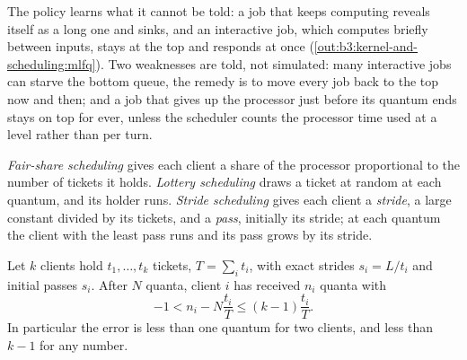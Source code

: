 The policy learns what it cannot be told: a job that keeps computing reveals itself as a long one and sinks, and an interactive job, which computes briefly between inputs, stays at the top and responds at once (\cref{out:b3:kernel-and-scheduling:mlfq}). Two weaknesses are told, not simulated: many interactive jobs can starve the bottom queue, the remedy is to move every job back to the top now and then; and a job that gives up the processor just before its quantum ends stays on top for ever, unless the scheduler counts the processor time used at a level rather than per turn.

\label{lst:b3:kernel-and-scheduling:mlfq}

\label{out:b3:kernel-and-scheduling:mlfq}

\begin{definition}\label{def:b3:kernel-and-scheduling:share}
\emph{Fair-share scheduling} gives each client a share of the processor proportional to the number of tickets it holds. \emph{Lottery scheduling} draws a ticket at random at each quantum, and its holder runs. \emph{Stride scheduling} gives each client a \emph{stride}, a large constant divided by its tickets, and a \emph{pass}, initially its stride; at each quantum the client with the least pass runs and its pass grows by its stride.
\end{definition}

\label{lst:b3:kernel-and-scheduling:stride}

\label{out:b3:kernel-and-scheduling:stride}

\begin{theorem}\label{thm:b3:kernel-and-scheduling:stride}
Let $k$ clients hold $t_1, \dots, t_k$ tickets, $T = \sum_i t_i$, with exact strides $s_i = L/t_i$ and initial passes $s_i$. After $N$ quanta, client $i$ has received $n_i$ quanta with
\[ -1 < n_i - N\frac{t_i}{T} \le (k - 1)\frac{t_i}{T}. \]
In particular the error is less than one quantum for two clients, and less than $k - 1$ for any number.
\end{theorem}

